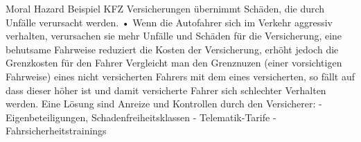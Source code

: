 Moral Hazard
Beispiel
KFZ Versicherungen übernimmt Schäden, die durch Unfälle verursacht werden.
• Wenn die Autofahrer sich im Verkehr aggressiv verhalten, verursachen sie mehr Unfälle und Schäden für die Versicherung, eine behutsame
Fahrweise reduziert die Kosten der Versicherung, erhöht jedoch die Grenzkosten für den Fahrer
Vergleicht man den Grenznuzen (einer vorsichtigen Fahrweise) eines nicht versicherten Fahrers mit dem eines versicherten, so fällt
auf dass dieser höher ist und damit versicherte Fahrer sich schlechter Verhalten werden.
Eine Lösung sind Anreize und Kontrollen durch den Versicherer: 
- Eigenbeteiligungen, Schadenfreiheitsklassen
- Telematik-Tarife
- Fahrsicherheitstrainings
